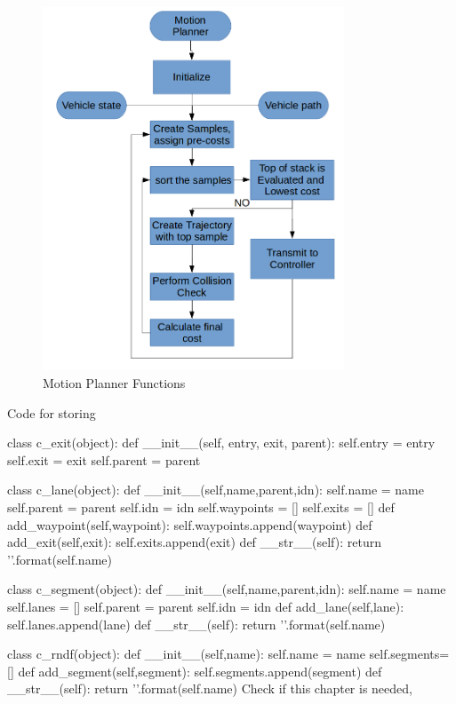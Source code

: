 \begin{figure}
	\centering
	\includegraphics[width=0.8\textwidth]{Images/implementation/motion_planner.png}
	\caption{Motion Planner Functions}
	\label{motion_planner_func}
\end{figure}






\iffalse

Code for storing 

class c_exit(object):
def __init__(self, entry, exit, parent):
self.entry = entry
self.exit = exit
self.parent = parent

class c_lane(object):
def __init__(self,name,parent,idn):
self.name = name
self.parent = parent
self.idn = idn
self.waypoints = []
self.exits = []
def add_waypoint(self,waypoint):
self.waypoints.append(waypoint)
def add_exit(self,exit):
self.exits.append(exit)
def __str__(self):
return '{}'.format(self.name)

class c_segment(object):
def __init__(self,name,parent,idn):
self.name = name
self.lanes = []
self.parent = parent
self.idn = idn
def add_lane(self,lane):
self.lanes.append(lane)
def __str__(self):
return '{}'.format(self.name)

class c_rndf(object):
def __init__(self,name):
self.name = name
self.segments= []
def add_segment(self,segment):
self.segments.append(segment)
def __str__(self):
return '{}'.format(self.name)
Check if this chapter is needed, 

